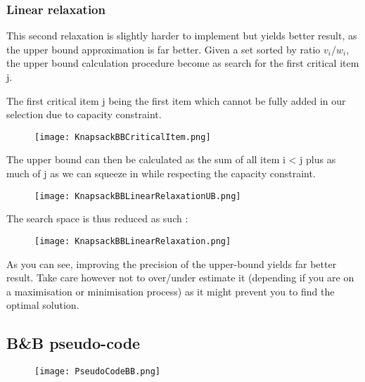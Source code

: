 \subsubsection{Linear relaxation}

This second relaxation is slightly harder to implement but yields better result, as 
the upper bound approximation is far better. Given a set sorted by ratio $v_i/w_i$,
the upper bound calculation procedure become as search for the first critical item j.
\newline

The first critical item j being the first item which cannot be fully added in our selection
due to capacity constraint. 

\begin{figure}[!ht]
    \centering
    \texttt{[image: KnapsackBBCriticalItem.png]}
    \label{fig:Knapsack_example}
\end{figure}
\FloatBarrier

The upper bound can then be calculated as the sum of all item i < j plus as much of j
as we can squeeze in while respecting the capacity constraint.

\begin{figure}[!ht]
    \centering
    \texttt{[image: KnapsackBBLinearRelaxationUB.png]}
    \label{fig:Knapsack_example}
\end{figure}
\FloatBarrier

The search space is thus reduced as such :

\begin{figure}[!ht]
    \centering
    \texttt{[image: KnapsackBBLinearRelaxation.png]}
    \label{fig:Knapsack_example}
\end{figure}
\FloatBarrier

As you can see, improving the precision of the upper-bound yields far better result. Take care however not to over/under estimate it (depending if you are on a maximisation or minimisation process) as it might prevent you to find the optimal solution.

\subsection{B\&B pseudo-code}

\begin{figure}[!ht]
    \centering
    \texttt{[image: PseudoCodeBB.png]}
    \label{fig:Knapsack_example}
\end{figure}
\FloatBarrier

